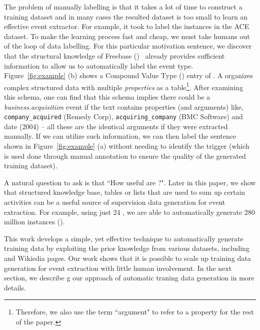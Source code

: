 
The problem of manually labelling is that it takes a lot of time to construct a training dataset and in many cases the resulted dataset is
too small to learn an effective event extractor. For example, it took  to label the  instances in the ACE
dataset. To make the learning process fast and cheap, we must take humans out of the loop of data labelling.  For this particular
motivation sentence, we discover that the structural knowledge of Freebase (\FB)~\cite{bollacker2008freebase} already provides sufficient
information to allow us to automatically label the event type. Figure~\ref{fig:example} (b) shows a Compound Value Type (\CVT) entry of
\FB. A \CVT organizes complex structured data with multiple \emph{properties} as a table\footnote{Therefore, we also use the term
``argument" to refer to a \CVT property for the rest of the paper.}. After examining this \CVT schema, one can find that this schema
implies there could be a \emph{business.acquisition} event if the text contains properties (and arguments) like, \texttt{company\_acquired}
(Remedy Corp), \texttt{acquiring\_company} (BMC Software) and date (2004) -- all these are the identical arguments if they were extracted
manually. If we can utilize such \CVT information, we can then label the sentence shown in Figure~\ref{fig:example} (a) without needing to
identify the trigger (which is used done through manual annotation to ensure the quality of the generated training dataset).


A natural question to ask is that ``How useful are \CVTs?". Later in this paper, we show that structured knowledge base, tables or lists
that are used to sum up certain activities can be a useful source of supervision data generation for event extraction. For example, using
just 24 \CVTs, we are able to automatically generate 280 million instances ().


This work develops a simple, yet effective technique to automatically generate training data by exploiting the prior \CVT knowledge from
various datasets, including \FB and Wikiedia pages. Our work shows that it is possible to scale up training data generation for event
extraction with little human involvement. In the next section, we describe g our approach of automatic traning data generation in more
details.


